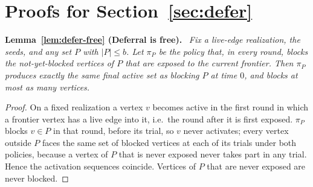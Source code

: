 \documentclass[preprint,11pt]{elsarticle}
\theoremstyle{definition}
\theoremstyle{remark}
\newenvironment{repeatlemma}[1][]{\par\medskip\noindent\textbf{#1.}\ \itshape}{\par\medskip}
\begin{document}
\appendix
{}
\renewcommand{\thetable}{\Alph{section}.\arabic{table}}
\renewcommand{\thefigure}{\Alph{section}.\arabic{figure}}
\renewcommand{\theequation}{\Alph{section}.\arabic{equation}}
\section{Proofs for Section~\ref{sec:defer}}\label{ec:defer-proofs}

\begin{repeatlemma}[Lemma~\ref{lem:defer-free} (Deferral is free)]
Fix a live-edge realization, the seeds, and any set $P$ with $|P|\le b$. Let
$\pi_P$ be the policy that, in every round, blocks the not-yet-blocked
vertices of $P$ that are exposed to the current frontier. Then $\pi_P$
produces exactly the same final active set as blocking $P$ at time $0$, and
blocks at most as many vertices.
\end{repeatlemma}
\begin{proof}
On a fixed realization a vertex $v$ becomes active in the first round in
which a frontier vertex has a live edge into it, i.e.\ the round after it is
first exposed. $\pi_P$ blocks $v\in P$ in that round, before its trial, so
$v$ never activates; every vertex outside $P$ faces the same set of blocked
vertices at each of its trials under both policies, because a vertex of $P$
that is never exposed never takes part in any trial. Hence the activation
sequences coincide. Vertices of $P$ that are never exposed are never
blocked.
\end{proof}
\end{document}
